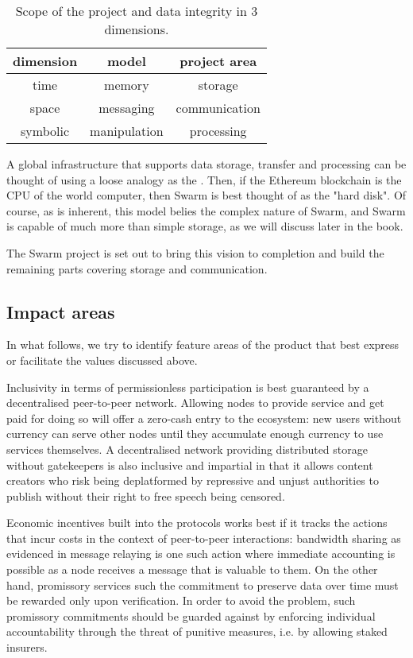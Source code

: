 \begin{table}[htb]
\centering
\begin{tabular}{c|c|c}
dimension & model & project area\\\hline
%
time & memory & storage \\
space & messaging & communication \\
symbolic & manipulation & processing \\
\end{tabular}
\caption{Scope of the project and data integrity in 3 dimensions.}
\label{tab:scope}
\end{table}

A global infrastructure that supports data storage, transfer and processing 
can be thought of using a loose analogy as the . Then, if the Ethereum blockchain is the CPU of the world computer, then Swarm is best thought of as the "hard disk". Of course, as is inherent, this model belies the complex nature of Swarm, and Swarm is capable of much more than simple storage, as we will discuss later in the book.

The Swarm project is set out to bring this vision to completion and build the remaining parts covering storage and communication. 

\subsection{Impact areas \statusorange}

In what follows, we try to identify feature areas of the product that best express or facilitate the values discussed above. 

Inclusivity in terms of permissionless participation is best guaranteed by a decentralised peer-to-peer network.  
Allowing nodes to provide service and get paid for doing so will offer a zero-cash entry to the ecosystem: new users without currency can serve other nodes until they accumulate enough currency to use services themselves. A decentralised network providing distributed storage without gatekeepers is also inclusive and impartial in that it allows content creators who risk being deplatformed by repressive and unjust authorities to publish without their right to free speech being censored. 

Economic incentives built into the protocols works best if it tracks the actions that incur costs in the context of peer-to-peer interactions: bandwidth sharing as evidenced in message relaying is one such action where immediate accounting is possible as a node receives a message that is valuable to them. On the other hand, promissory services such the commitment to preserve data over time must be rewarded only upon verification. In order to avoid the  problem, such promissory commitments should be guarded against by enforcing individual accountability through the threat of punitive measures, i.e. by allowing staked insurers.

